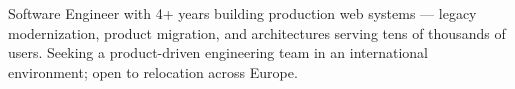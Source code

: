 
Software Engineer with 4+ years building production web systems --- legacy modernization, product migration, and architectures serving tens of thousands of users. Seeking a product-driven engineering team in an international environment; open to relocation across Europe.
